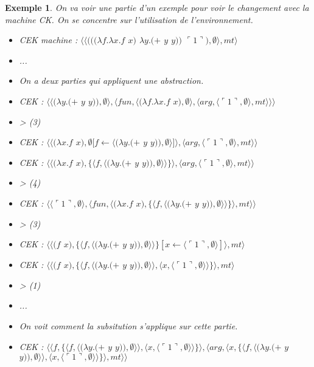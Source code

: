 \documentclass[10pt,a4paper]{report}
\newtheorem{ex}{Exemple}
\begin{document}
\begin{ex}
	On va voir une partie d'un exemple pour voir le changement avec la machine CK. On se concentre sur l'utilisation de l'environnement.
	\medbreak
	
	\begin{itemize}
		\item[] CEK machine : $\langle\langle(((\lambda f.\lambda x.f$ $x)$ $\lambda y.(+$ $y$ $y))$ $\ulcorner 1\urcorner),\emptyset\rangle,mt\rangle$
		\item[] ...
		\item[] On a deux parties qui appliquent une abstraction.
		\item[] CEK : $\langle\langle(\lambda y.(+$ $y$ $y)),\emptyset\rangle,\langle fun,\langle(\lambda f.\lambda x.f$ $x),\emptyset\rangle,\langle arg,\langle\ulcorner 1\urcorner,\emptyset\rangle,mt\rangle\rangle\rangle$
		\item[] > (3) 
		\item[] CEK : $\langle\langle(\lambda x.f$ $x),\emptyset[f \leftarrow \langle(\lambda y.(+$ $y$ $y)),\emptyset\rangle]\rangle,\langle arg,\langle\ulcorner 1\urcorner,\emptyset\rangle,mt\rangle\rangle$
		\item[] CEK : $\langle\langle(\lambda x.f$ $x),\{\langle f,\langle(\lambda y.(+$ $y$ $y)),\emptyset\rangle\rangle\}\rangle,\langle arg,\langle\ulcorner 1\urcorner,\emptyset\rangle,mt\rangle\rangle$
		\item[] > (4) 
		\item[] CEK : $\langle\langle\ulcorner 1\urcorner,\emptyset\rangle,\langle fun,\langle(\lambda x.f$ $x),\{\langle f,\langle(\lambda y.(+$ $y$ $y)),\emptyset\rangle\rangle\}\rangle,mt\rangle\rangle$
		\item[] > (3) 
		\item[] CEK : $\langle\langle(f$ $x),\{\langle f,\langle(\lambda y.(+$ $y$ $y)),\emptyset\rangle\rangle\}[x \leftarrow \langle\ulcorner 1\urcorner,\emptyset\rangle]\rangle,mt\rangle$
		\item[] CEK : $\langle\langle(f$ $x),\{\langle f,\langle(\lambda y.(+$ $y$ $y)),\emptyset\rangle\rangle,\langle x,\langle\ulcorner 1\urcorner,\emptyset\rangle\rangle\}\rangle,mt\rangle$
		\item[] > (1)
		\item[] ...
		\item[] On voit comment la subsitution s'applique sur cette partie.
		\item[] CEK : $\langle\langle f,\{\langle f,\langle(\lambda y.(+$ $y$ $y)),\emptyset\rangle\rangle,\langle x,\langle\ulcorner 1\urcorner,\emptyset\rangle\rangle\}\rangle,\langle arg,\langle x,\{\langle f,\langle(\lambda y.(+$ $y$ $y)),\emptyset\rangle\rangle,\langle x,\langle\ulcorner 1\urcorner,\emptyset\rangle\rangle\}\rangle,mt\rangle\rangle$

\end{itemize}
\end{ex}
\end{document}
